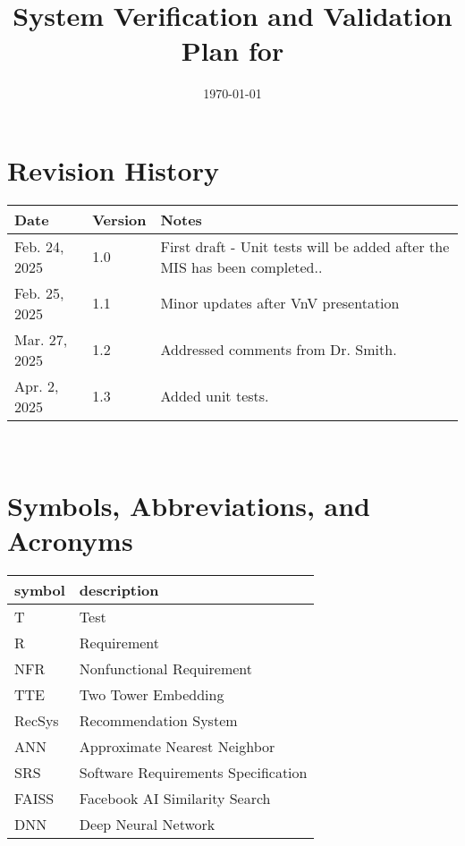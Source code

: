 \documentclass[12pt, titlepage]{article}
\begin{document}
\title{System Verification and Validation Plan for \progname{}} 
\author{\authname}
\date{\today}
	
\maketitle


\section*{Revision History}
\begin{tabularx}{\textwidth}{p{3cm}p{2cm}X}
\toprule {\bf Date} & {\bf Version} & {\bf Notes}\\
\midrule
Feb. 24, 2025 & 1.0 & First draft - Unit tests will be added after the MIS has been completed..\\
Feb. 25, 2025 & 1.1 & Minor updates after VnV presentation\\
Mar. 27, 2025 & 1.2 & Addressed comments from Dr. Smith.\\
Apr. 2, 2025 & 1.3 & Added unit tests.\\
\bottomrule
\end{tabularx}

~\\

\newpage

\tableofcontents

\listoftables

\newpage

\section{Symbols, Abbreviations, and Acronyms}

\renewcommand{\arraystretch}{1.2}
\begin{tabular}{l l} 
  \toprule		
  \textbf{symbol} & \textbf{description}\\
  \midrule 
  T & Test\\
  R & Requirement\\
  NFR & Nonfunctional Requirement\\
  TTE & Two Tower Embedding\\
  RecSys & Recommendation System\\
  ANN & Approximate Nearest Neighbor\\
  SRS & Software Requirements Specification\\
  FAISS & Facebook AI Similarity Search\\
  DNN & Deep Neural Network\\
  \bottomrule
\end{tabular}\\
\end{document}
